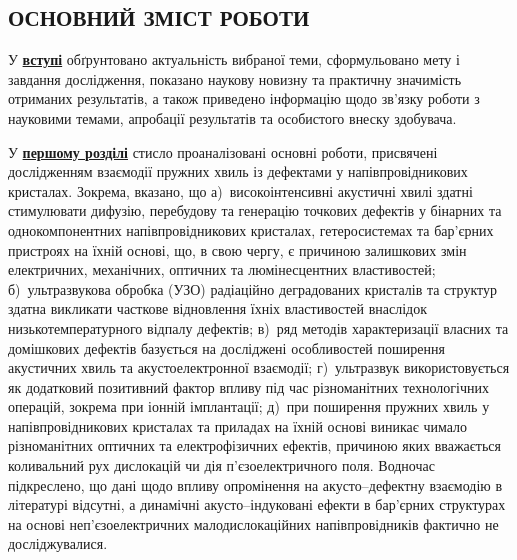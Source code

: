 

\begin{center}
\section*{\MakeUppercase{ОСНОВНИЙ ЗМІСТ РОБОТИ}}
\end{center}

У  \underline{\textbf{вступі}}  обґрунтовано актуальність  вибраної  теми, сформульовано  мету  і
завдання  дослідження, показано  наукову  новизну  та практичну  значимість
отриманих результатів, а також приведено інформацію щодо зв’язку роботи з науковими темами, апробації результатів та
особистого внеску здобувача.


У  \underline{\textbf{першому розділі}}   стисло проаналізовані основні роботи, присвячені
дослідженням взаємодії пружних хвиль із дефектами у напівпровідникових кристалах.
Зокрема,
вказано, що
а)~високоінтенсивні акустичні хвилі здатні стимулювати дифузію, перебудову та генерацію точкових дефектів у бінарних та однокомпонентних напівпровідникових кристалах, гетеросистемах та бар'єрних пристроях на їхній основі,
що, в свою чергу, є причиною залишкових змін електричних, механічних, оптичних та  люмінесцентних властивостей;
б)~ультразвукова обробка (УЗО) радіаційно деградованих кристалів та структур здатна викликати часткове відновлення їхніх властивостей внаслідок низькотемпературного відпалу дефектів;
в)~ряд методів характеризації власних та домішкових дефектів базується на досліджені особливостей поширення акустичних хвиль та акустоелектронної взаємодії;
г)~ультразвук використовується як додатковий позитивний фактор впливу під час різноманітних технологічних операцій, зокрема при іонній імплантації;
д)~при поширення пружних хвиль у напівпровідникових кристалах та приладах на їхній основі виникає чимало різноманітних оптичних та електрофізичних ефектів, причиною яких вважається коливальний рух дислокацій чи дія п'єзоелектричного поля.
Водночас підкреслено,
що дані щодо впливу опромінення на акусто--дефектну взаємодію в літературі відсутні,
а динамічні акусто--індуковані ефекти в бар'єрних структурах на основі неп'єзоелектричних малодислокаційних напівпровідників фактично не досліджувалися.

